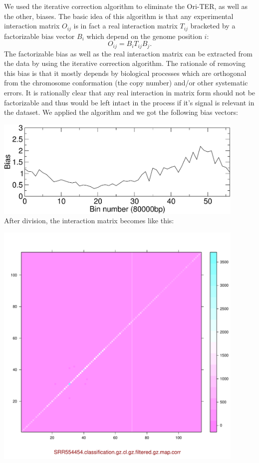\documentclass[12pt,a4paper,notitlepage]{article}
\begin{document}
We used the iterative correction algorithm\cite{Imakaev2012} to
eliminate the Ori-TER, as well as the other, biases. The basic idea of
this algorithm is that any experimental interaction matrix $O_{ij}$ is
in fact a real interaction matrix $T_{ij}$ bracketed by a
factorizable bias vector $B_i$ which depend on the genome position $i$:
\begin{equation}
O_{ij} = B_i T_{ij} B_j.
\end{equation}
The factorizable bias as well as the real interaction matrix can be
extracted from the data by using the iterative correction
algorithm. The rationale of removing this bias is that it mostly
depends by biological processes which are orthogonal from the
chromosome conformation (the copy number) and/or other systematic
errors. It is rationally clear that any real interaction in matrix
form should not be factorizable and thus would be left intact in the
process if it's signal is relevant in the dataset. We applied the
algorithm and we got the following bias vectors:

\vspace{.5cm}\hspace{2cm}\includegraphics[width=12cm]{SRR554457bias}\\

After division, the interaction matrix becomes like this:

\vspace{.5cm}\hspace{2cm}\includegraphics[page=1,width=12cm]{corr}\\
\end{document}
